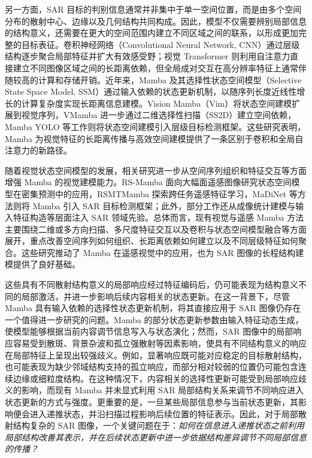 \documentclass[journal]{IEEEtran}
\begin{document}
另一方面，SAR 目标的判别信息通常并非集中于单一空间位置，而是由多个空间分布的散射中心、边缘以及几何结构共同构成。因此，模型不仅需要辨别局部信息的结构意义，还需要在更大的空间范围内建立不同区域之间的联系，以形成更加完整的目标表征。卷积神经网络（Convolutional Neural Network, CNN）通过层级结构逐步聚合局部特征并扩大有效感受野\cite{resnet2015}；视觉 Transformer 则利用自注意力直接建立不同图像区域之间的长距离依赖\cite{vit2020}，但全局成对交互在高分辨率特征上通常伴随较高的计算和存储开销。近年来，Mamba 及其选择性状态空间模型（Selective State Space Model, SSM）通过输入依赖的状态更新机制，以随序列长度近线性增长的计算复杂度实现长距离信息建模\cite{mamba2023}。Vision Mamba（Vim）将状态空间建模扩展到视觉序列\cite{vim2024}，VMamba 进一步通过二维选择性扫描（SS2D）建立空间依赖\cite{vmamba2024}，Mamba YOLO 等工作则将状态空间建模引入层级目标检测框架\cite{mambayolo2024}。这些研究表明，Mamba 为视觉特征的长距离传播与高效空间建模提供了一条区别于卷积和全局自注意力的新路径。

随着视觉状态空间模型的发展，相关研究进一步从空间序列组织和特征交互等方面增强 Mamba 的视觉建模能力。RS-Mamba 面向大幅面遥感图像研究状态空间模型在密集预测中的应用\cite{rsmamba2024}，RSMTMamba 探索跨任务遥感特征学习\cite{rstmtmamba2025}，MaDiNet 等方法则将 Mamba 引入 SAR 目标检测框架\cite{madinet2025}；此外，部分工作还从成像统计建模与输入特征构造等层面注入 SAR 领域先验\cite{mambadip,rssnet}。总体而言，现有视觉与遥感 Mamba 方法主要围绕二维或多方向扫描、多尺度特征交互以及卷积与状态空间模型融合等方面展开，重点改善空间序列如何组织、长距离依赖如何建立以及不同层级特征如何聚合。这些研究推动了 Mamba 在遥感视觉中的应用，也为 SAR 图像的长程结构建模提供了良好基础。

这些具有不同散射结构意义的局部响应经过特征编码后，仍可能表现为结构意义不同的局部激活，并进一步影响后续内容相关的状态更新。在这一背景下，尽管 Mamba 具有输入依赖的选择性状态更新机制，将其直接应用于 SAR 图像仍存在一个值得进一步研究的问题。Mamba 的部分状态更新参数由输入特征动态生成，使模型能够根据当前内容调节信息写入与状态演化；然而，SAR 图像中的局部响应容易受到散斑、背景杂波和孤立强散射等因素影响，使具有不同结构意义的响应在局部特征上呈现出较强歧义。例如，显著响应既可能对应稳定的目标散射结构，也可能表现为缺少邻域结构支持的孤立响应，而部分相对较弱的位置仍可能包含连续边缘或细粒度结构。在这种情况下，内容相关的选择性更新可能受到局部响应歧义的影响，而现有 Mamba 并未显式利用 SAR 局部结构关系来调节不同响应进入状态更新的方式与强度。更重要的是，一旦某些局部信息参与当前状态更新，其影响便会进入递推状态，并沿扫描过程影响后续位置的特征表示。因此，对于局部散射结构复杂的 SAR 图像，一个关键问题在于：\emph{如何在信息进入递推状态之前利用局部结构改善其表示，并在后续状态更新中进一步依据结构差异调节不同局部信息的传播？}
\end{document}

